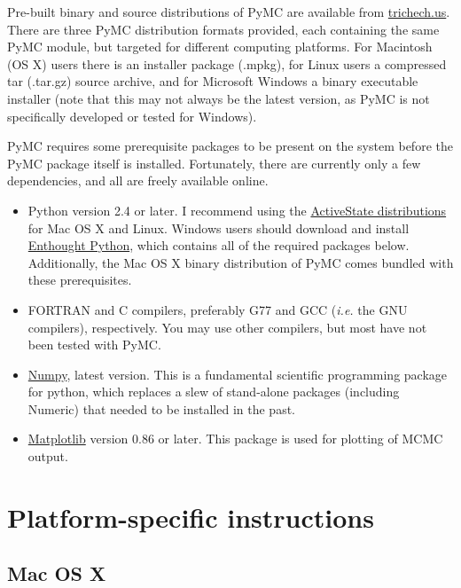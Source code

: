 \documentclass[]{book}
\begin{document}
Pre-built binary and source distributions of PyMC are available from \href{http://trichech.us}{trichech.us}. There are three PyMC distribution formats provided, each containing the same PyMC module, but targeted for different computing platforms. For Macintosh (OS X) users there is an installer package (.mpkg), for Linux users a compressed tar (.tar.gz) source archive, and for Microsoft Windows a binary executable installer (note that this may not always be the latest version, as PyMC is not specifically developed or tested for Windows).

PyMC requires some prerequisite packages to be present on the system before the PyMC package itself is installed. Fortunately, there are currently only a few dependencies, and all are freely available online.
\begin{itemize}

\item Python version 2.4 or later. I recommend using the \href{http://www.activestate.com/Products/ActivePython/}{ActiveState distributions} for Mac OS X and Linux. Windows users should download and install \href{http://code.enthought.com/enthon/}{Enthought Python}, which contains all of the required packages below. Additionally, the Mac OS X binary distribution of PyMC comes bundled with these prerequisites.

\item FORTRAN and C compilers, preferably G77 and GCC (\emph{i.e.} the GNU compilers), respectively. You may use other compilers, but most have not been tested with PyMC.

\item \href{http://numeric.scipy.org/}{Numpy}, latest version. This is a fundamental scientific programming package for python, which replaces a slew of stand-alone packages (including Numeric) that needed to be installed in the past.

\item \href{http://matplotlib.sourceforge.net/}{Matplotlib} version 0.86 or later. This package is used for plotting of MCMC output.
\end{itemize}


\section{Platform-specific instructions}
\subsection{Mac OS X}
\end{document}
